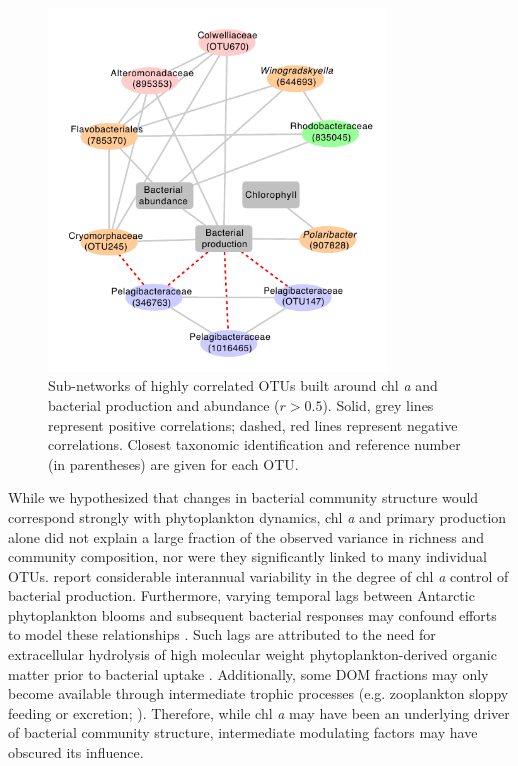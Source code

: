 \begin{figure}[ht!] 
\centering 
\includegraphics[width=0.8\textwidth]{Chapter_5_LTER/Figures/Figure_11_network_top100otus_minocc0_pearson5_subset_BA_BP_Chl}
\caption[Sub-networks of highly correlated OTUs built around chl a and bacterial production and abundance.]{Sub-networks of highly correlated OTUs built around chl \emph{a} and bacterial production and abundance ($r > 0.5$). Solid, grey lines represent positive correlations; dashed, red lines represent negative correlations. Closest taxonomic identification and reference number (in parentheses) are given for each OTU.} 
\label{fig:ch4:network} 
\end{figure}


While we hypothesized that changes in bacterial community structure would correspond strongly with phytoplankton dynamics, chl \emph{a} and primary production alone did not explain a large fraction of the observed variance in richness and community composition, nor were they significantly linked to many individual OTUs. \citet{kim2016decedal} report considerable interannual variability in the degree of chl \emph{a} control of bacterial production. Furthermore, varying temporal lags between Antarctic phytoplankton blooms and subsequent bacterial responses may confound efforts to model these relationships \citep{billen1991phytoplankton,ducklow2001seasonal,luria2016seasonal}. Such lags are attributed to the need for extracellular hydrolysis of high molecular weight phytoplankton-derived organic matter prior to bacterial uptake \citep{billen1991phytoplankton,ducklow2001seasonal,lancelot1991modelling,kirchman2001glucose}. Additionally, some DOM fractions may only become available through intermediate trophic processes (e.g. zooplankton sloppy feeding or excretion; \citealt{dsvse12}). Therefore, while chl \emph{a} may have been an underlying driver of bacterial community structure, intermediate modulating factors may have obscured its influence. 


